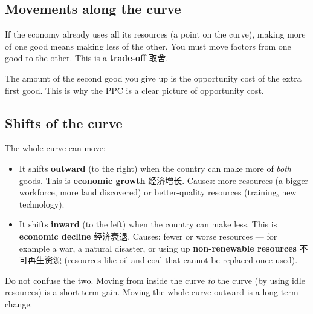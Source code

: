 \documentclass[11pt]{article}
\begin{document}
\subsection*{Movements along the curve}

If the economy already uses all its resources (a point on the curve), making more of one good means making less of the other. You must move factors from one good to the other. This is a \textbf{trade-off} 取舍.

The amount of the second good you give up is the opportunity cost of the extra first good. This is why the PPC is a clear picture of opportunity cost.

\subsection*{Shifts of the curve}

The whole curve can move:

\begin{itemize}
\item It shifts \textbf{outward} (to the right) when the country can make more of \emph{both} goods. This is \textbf{economic growth} 经济增长. Causes: more resources (a bigger workforce, more land discovered) or better-quality resources (training, new technology).

\item It shifts \textbf{inward} (to the left) when the country can make less. This is \textbf{economic decline} 经济衰退. Causes: fewer or worse resources — for example a war, a natural disaster, or using up \textbf{non-renewable resources} 不可再生资源 (resources like oil and coal that cannot be replaced once used).

\end{itemize}

Do not confuse the two. Moving from inside the curve \emph{to} the curve (by using idle resources) is a short-term gain. Moving the whole curve outward is a long-term change.
\end{document}
